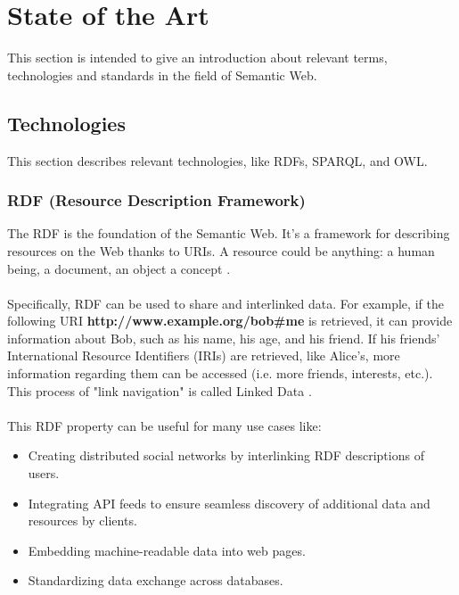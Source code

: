 \chapter{State of the Art\label{cha:chapter2}}

This section is intended to give an introduction about relevant terms, technologies and standards in the field of Semantic Web. 

\section{Technologies \label{sec:tech}}

This section describes relevant technologies, like RDFs, SPARQL, and OWL.

\subsection{RDF (Resource Description Framework)\label{sec:rdf_primer}}

The RDF is the foundation of the Semantic Web. It's a framework for describing resources on the Web thanks to URIs. A resource could be anything: a human being, a document, an object a concept \cite{rdf}. 
\\
\\
Specifically, RDF can be used to share and interlinked data. For example, if the following URI \space \textbf{http://www.example.org/bob\#me} is retrieved, it can provide information about Bob, such as his name, his age, and his friend.
If his friends' International Resource Identifiers (IRIs) are retrieved, like Alice's, more information regarding them can be accessed (i.e. more friends, interests, etc.). This process of "link navigation" is called Linked Data \cite{rdf}.
\\
\\
This RDF property can be useful for many use cases like: 
\begin{itemize}
	\item Creating distributed social networks by interlinking RDF descriptions of users.
	\item Integrating API feeds to ensure seamless discovery of additional data and resources by clients.
	\item Embedding machine-readable data into web pages.
	\item Standardizing data exchange across databases.
\end{itemize}

